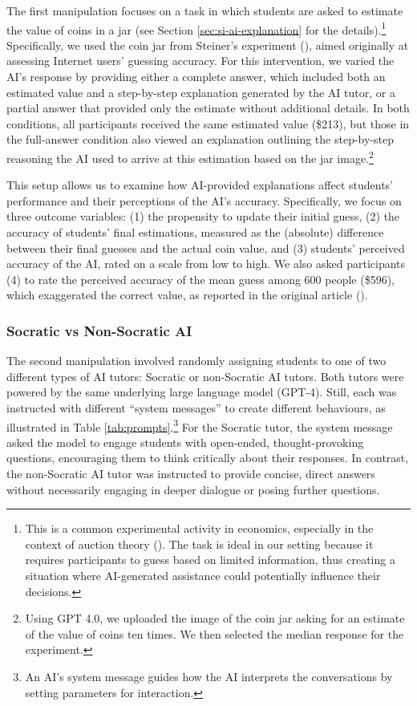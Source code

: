 \documentclass[
  12pt,
]{article}
\begin{document}
The first manipulation focuses on a task in which students are asked to estimate the value of coins in a jar (see Section \ref{sec:si-ai-explanation} for the details).\footnote{This is a common experimental activity in economics, especially in the context of auction theory (). The task is ideal in our setting because it requires participants to guess based on limited information, thus creating a situation where AI-generated assistance could potentially influence their decisions.} Specifically, we used the coin jar from Steiner's experiment (), aimed originally at assessing Internet users' guessing accuracy. For this intervention, we varied the AI's response by providing either a complete answer, which included both an estimated value and a step-by-step explanation generated by the AI tutor, or a partial answer that provided only the estimate without additional details. In both conditions, all participants received the same estimated value (\$213), but those in the full-answer condition also viewed an explanation outlining the step-by-step reasoning the AI used to arrive at this estimation based on the jar image.\footnote{Using GPT 4.0, we uploaded the image of the coin jar asking for an estimate of the value of coins ten times. We then selected the median response for the experiment.}

This setup allows us to examine how AI-provided explanations affect students' performance and their perceptions of the AI's accuracy. Specifically, we focus on three outcome variables: (1) the propensity to update their initial guess, (2) the accuracy of students' final estimations, measured as the (absolute) difference between their final guesses and the actual coin value, and (3) students' perceived accuracy of the AI, rated on a scale from low to high. We also asked participants (4) to rate the perceived accuracy of the mean guess among 600 people (\$596), which exaggerated the correct value, as reported in the original article ().

\subsubsection{Socratic vs Non-Socratic AI}\label{socratic-vs-non-socratic-ai}

The second manipulation involved randomly assigning students to one of two different types of AI tutors: Socratic or non-Socratic AI tutors. Both tutors were powered by the same underlying large language model (GPT-4). Still, each was instructed with different ``system messages'' to create different behaviours, as illustrated in Table \ref{tab:prompts}.\footnote{An AI's system message guides how the AI interprets the conversations by setting parameters for interaction.} For the Socratic tutor, the system message asked the model to engage students with open-ended, thought-provoking questions, encouraging them to think critically about their responses. In contrast, the non-Socratic AI tutor was instructed to provide concise, direct answers without necessarily engaging in deeper dialogue or posing further questions.
\end{document}
